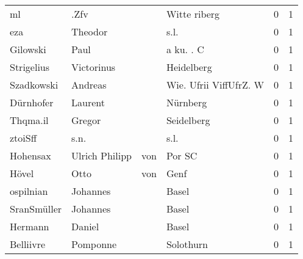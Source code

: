 \begin{tabular}{llllrr}
                       ml &                               .Zfv &             &                                Witte riberg &          0 &         1 \\
                      eza &                            Theodor &             &                                        s.l. &          0 &         1 \\
                 Gilowski &                               Paul &             &                                   a ku. . C &          0 &         1 \\
               Strigelius &                         Victorinus &             &                                  Heidelberg &          0 &         1 \\
               Szadkowski &                            Andreas &             &                      Wie. Ufrii ViffUfrZ. W &          0 &         1 \\
                Dürnhofer &                            Laurent &             &                                    Nürnberg &          0 &         1 \\
                 Thqma.il &                             Gregor &             &                                  Seidelberg &          0 &         1 \\
                  ztoiSff &                               s.n. &             &                                        s.l. &          0 &         1 \\
                 Hohensax &                     Ulrich Philipp &         von &                                      Por SC &          0 &         1 \\
                    Hövel &                               Otto &         von &                                        Genf &          0 &         1 \\
                ospilnian &                           Johannes &             &                                       Basel &          0 &         1 \\
              SranSmüller &                           Johannes &             &                                       Basel &          0 &         1 \\
                  Hermann &                             Daniel &             &                                       Basel &          0 &         1 \\
                Belliivre &                           Pomponne &             &                                   Solothurn &          0 &         1 \\

\end{tabular}
